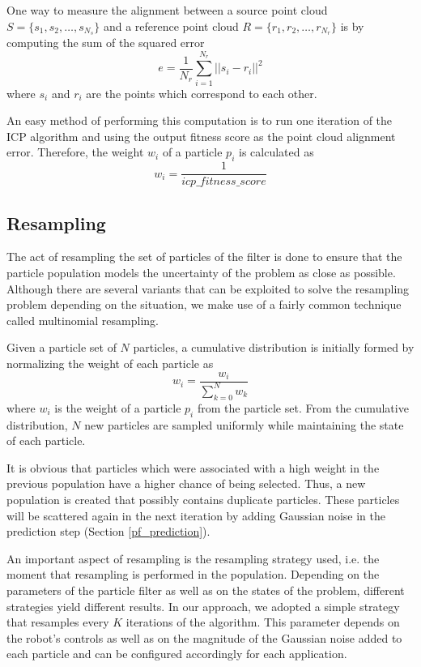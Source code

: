 One way to measure the alignment between a source point cloud
$S = \{s_1, s_2, \dots, s_{N_s}\}$ and a reference point cloud
$R = \{r_1, r_2, \dots, r_{N_r}\}$ is by computing the sum of the
squared error
\begin{equation}
    e = \frac{1}{N_r} \sum_{i=1}^{N_r} || s_i - r_i ||^2
\end{equation}
where $s_i$ and $r_i$ are the points which correspond to each other.

An easy method of performing this computation is to run one iteration of
the ICP algorithm and using the output fitness score as the point cloud
alignment error.
Therefore, the weight $w_i$ of a particle $p_i$ is calculated as
\begin{equation}
    w_i = \frac{1}{icp\_fitness\_score}
\end{equation}

\subsection{Resampling}

The act of resampling the set of particles of the filter is done
to ensure that the particle population models the
uncertainty of the problem as close as possible.
Although there are several variants \parencite{Douc2005} that can be
exploited to solve the resampling problem depending on the situation,
we make use of a fairly common technique called multinomial resampling.

Given a particle set of $N$ particles, a cumulative distribution is
initially formed by normalizing the weight of each particle as
\begin{equation}
    w_i = \frac{w_i}{\sum\limits_{k=0}^N w_k}
\end{equation}
where $w_i$ is the weight of a particle $p_i$ from the particle set.
From the cumulative distribution, $N$ new particles are sampled
uniformly while maintaining the state of each particle.

It is obvious that particles which were associated with a high
weight in the previous population have a higher chance of being selected.
Thus, a new population is created that possibly contains duplicate
particles.
These particles will be scattered again in the next iteration by
adding Gaussian noise in the prediction step (Section \ref{pf_prediction}).

An important aspect of resampling is the resampling strategy used,
i.e. the moment that resampling is performed in the population.
Depending on the parameters of the particle filter as well as on the
states of the problem, different strategies yield different results.
In our approach, we adopted a simple strategy that resamples every
$K$ iterations of the algorithm.
This parameter depends on the robot's controls as well as on the magnitude of
the Gaussian noise added to each particle and can be configured
accordingly for each application.

